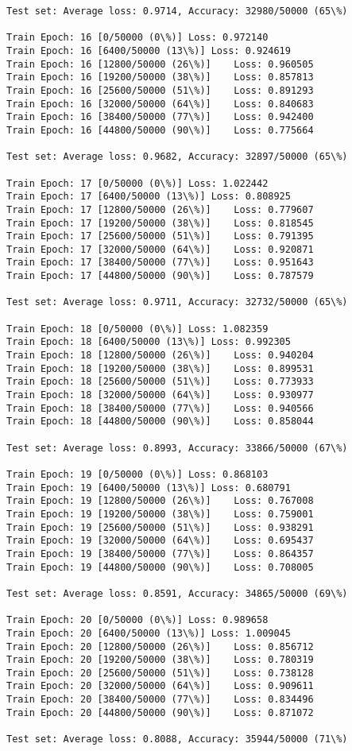 \documentclass[11pt]{article}
\begin{document}
\begin{Verbatim}[commandchars=\\\{\}]
Test set: Average loss: 0.9714, Accuracy: 32980/50000 (65\%)

Train Epoch: 16 [0/50000 (0\%)]	Loss: 0.972140
Train Epoch: 16 [6400/50000 (13\%)]	Loss: 0.924619
Train Epoch: 16 [12800/50000 (26\%)]	Loss: 0.960505
Train Epoch: 16 [19200/50000 (38\%)]	Loss: 0.857813
Train Epoch: 16 [25600/50000 (51\%)]	Loss: 0.891293
Train Epoch: 16 [32000/50000 (64\%)]	Loss: 0.840683
Train Epoch: 16 [38400/50000 (77\%)]	Loss: 0.942400
Train Epoch: 16 [44800/50000 (90\%)]	Loss: 0.775664

Test set: Average loss: 0.9682, Accuracy: 32897/50000 (65\%)

Train Epoch: 17 [0/50000 (0\%)]	Loss: 1.022442
Train Epoch: 17 [6400/50000 (13\%)]	Loss: 0.808925
Train Epoch: 17 [12800/50000 (26\%)]	Loss: 0.779607
Train Epoch: 17 [19200/50000 (38\%)]	Loss: 0.818545
Train Epoch: 17 [25600/50000 (51\%)]	Loss: 0.791395
Train Epoch: 17 [32000/50000 (64\%)]	Loss: 0.920871
Train Epoch: 17 [38400/50000 (77\%)]	Loss: 0.951643
Train Epoch: 17 [44800/50000 (90\%)]	Loss: 0.787579

Test set: Average loss: 0.9711, Accuracy: 32732/50000 (65\%)

Train Epoch: 18 [0/50000 (0\%)]	Loss: 1.082359
Train Epoch: 18 [6400/50000 (13\%)]	Loss: 0.992305
Train Epoch: 18 [12800/50000 (26\%)]	Loss: 0.940204
Train Epoch: 18 [19200/50000 (38\%)]	Loss: 0.899531
Train Epoch: 18 [25600/50000 (51\%)]	Loss: 0.773933
Train Epoch: 18 [32000/50000 (64\%)]	Loss: 0.930977
Train Epoch: 18 [38400/50000 (77\%)]	Loss: 0.940566
Train Epoch: 18 [44800/50000 (90\%)]	Loss: 0.858044

Test set: Average loss: 0.8993, Accuracy: 33866/50000 (67\%)

Train Epoch: 19 [0/50000 (0\%)]	Loss: 0.868103
Train Epoch: 19 [6400/50000 (13\%)]	Loss: 0.680791
Train Epoch: 19 [12800/50000 (26\%)]	Loss: 0.767008
Train Epoch: 19 [19200/50000 (38\%)]	Loss: 0.759001
Train Epoch: 19 [25600/50000 (51\%)]	Loss: 0.938291
Train Epoch: 19 [32000/50000 (64\%)]	Loss: 0.695437
Train Epoch: 19 [38400/50000 (77\%)]	Loss: 0.864357
Train Epoch: 19 [44800/50000 (90\%)]	Loss: 0.708005

Test set: Average loss: 0.8591, Accuracy: 34865/50000 (69\%)

Train Epoch: 20 [0/50000 (0\%)]	Loss: 0.989658
Train Epoch: 20 [6400/50000 (13\%)]	Loss: 1.009045
Train Epoch: 20 [12800/50000 (26\%)]	Loss: 0.856712
Train Epoch: 20 [19200/50000 (38\%)]	Loss: 0.780319
Train Epoch: 20 [25600/50000 (51\%)]	Loss: 0.738128
Train Epoch: 20 [32000/50000 (64\%)]	Loss: 0.909611
Train Epoch: 20 [38400/50000 (77\%)]	Loss: 0.834496
Train Epoch: 20 [44800/50000 (90\%)]	Loss: 0.871072

Test set: Average loss: 0.8088, Accuracy: 35944/50000 (71\%)


    \end{Verbatim}
\end{document}
